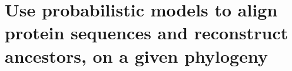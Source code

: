 \chapter{Use probabilistic models to align protein sequences and reconstruct ancestors, on a given phylogeny}
